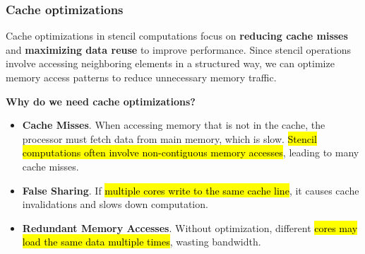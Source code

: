 \subsubsection{Cache optimizations}

Cache optimizations in stencil computations focus on \textbf{reducing cache misses} and \textbf{maximizing data reuse} to improve performance. Since stencil operations involve accessing neighboring elements in a structured way, we can optimize memory access patterns to reduce unnecessary memory traffic.

\highspace
\begin{flushleft}
    \textcolor{Green3}{ \textbf{Why do we need cache optimizations?}}
\end{flushleft}
\begin{itemize}
    \item \textbf{Cache Misses}. When accessing memory that is not in the cache, the processor must fetch data from main memory, which is slow. \hl{Stencil computations often involve non-contiguous memory accesses}, leading to many cache misses.
    \item \textbf{False Sharing}. If \hl{multiple cores write to the same cache line}, it causes cache invalidations and slows down computation.
    \item \textbf{Redundant Memory Accesses}. Without optimization, different \hl{cores may load the same data multiple times}, wasting bandwidth.
\end{itemize}

